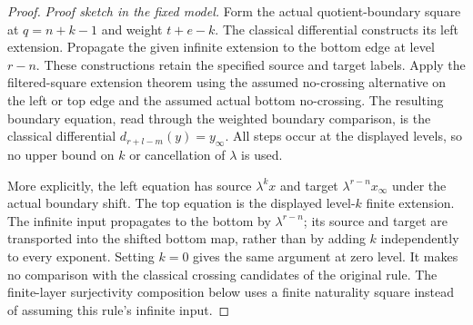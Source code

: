 \begin{proof}
\textit{Proof sketch in the fixed model.}
Form the actual quotient-boundary square at $q=n+k-1$ and weight $t+e-k$. The classical differential constructs its left extension. Propagate the given infinite extension to the bottom edge at level $r-n$. These constructions retain the specified source and target labels. Apply the filtered-square extension theorem using the assumed no-crossing alternative on the left or top edge and the assumed actual bottom no-crossing. The resulting boundary equation, read through the weighted boundary comparison, is the classical differential $d_{r+l-m}(y)=y_\infty$. All steps occur at the displayed levels, so no upper bound on $k$ or cancellation of $\lambda$ is used.

More explicitly, the left equation has source $\lambda^kx$ and
target $\lambda^{r-n}x_\infty$ under the actual boundary shift.
The top equation is the displayed level-$k$ finite extension.
The infinite input propagates to the bottom by $\lambda^{r-n}$;
its source and target are transported into the shifted bottom map,
rather than by adding $k$ independently to every exponent.
Setting $k=0$ gives the same argument at zero level. It makes no
comparison with the classical crossing candidates of the original rule.
The finite-layer surjectivity composition below uses a finite
naturality square instead of assuming this rule's infinite input.
\end{proof}



